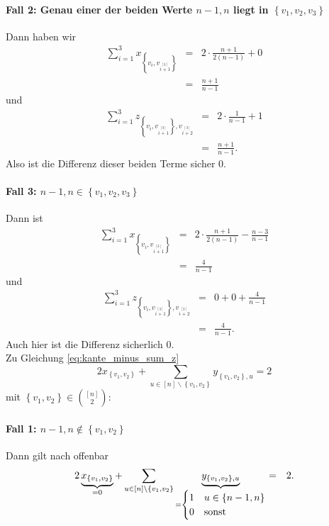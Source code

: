 \documentclass[10p,a4paper,BCOR = 12mm, DIV=15]{scrbook}
\begin{document}
\begin{bew}
\paragraph{Fall 2: Genau einer der beiden Werte $n-1, n$ liegt in $\left\{v_1, v_2, v_3\right\}$} Dann haben wir 
\begin{eqnarray*}
\sum_{i=1}^3 x_{\left\{v_{i}, v_{i \stackrel{\left[3\right]}{+} 1}\right\}} & = & 2 \cdot \frac{n+1}{2\left(n-1\right)} + 0 \\
& = & \frac{n+1}{n-1}
\end{eqnarray*}
und
\begin{eqnarray*}
\sum_{i=1}^3 z_{
\left\{
v_{i}, 
v_{i \stackrel{\left[3\right]}{+} 1}
\right\}, 
v_{i \stackrel{\left[3\right]}{+} 2}} & = & 2\cdot \frac{1}{n-1} + 1 \\
& = & \frac{n+1}{n-1}.
\end{eqnarray*}
Also ist die Differenz dieser beiden Terme sicher 0.

\paragraph{Fall 3: $n-1, n\in \left\{v_1, v_2, v_3\right\}$} Dann ist 
\begin{eqnarray*}
\sum_{i=1}^3 x_{\left\{v_{i}, v_{i \stackrel{\left[3\right]}{+} 1}\right\}} & = & 2 \cdot \frac{n+1}{2\left(n-1\right)} - \frac{n-3}{n-1} \\
& = & \frac{4}{n-1}
\end{eqnarray*}
und
\begin{eqnarray*}
\sum_{i=1}^3 z_{
\left\{
v_{i}, 
v_{i \stackrel{\left[3\right]}{+} 1}
\right\}, 
v_{i \stackrel{\left[3\right]}{+} 2}} & = & 0 + 0 + \frac{4}{n-1} \\
& = & \frac{4}{n-1}.
\end{eqnarray*}
Auch hier ist die Differenz sicherlich 0.
\\

Zu Gleichung \eqref{eq:kante_minus_sum_z} 
\begin{displaymath}
2 x_{\left\{v_1, v_2\right\}} + \sum_{u\in[n]\backslash\left\{v_1, v_2\right\}} y_{\left\{v_1, v_2\right\}, u} = 2
\end{displaymath}
mit $\left\{v_1, v_2\right\} \in {\left[n\right] \choose 2}$:

\paragraph{Fall 1: $n-1, n\notin \left\{v_1, v_2\right\}$} Dann gilt nach offenbar
\begin{eqnarray*}
2 \underbrace{x_{\left\{v_1, v_2\right\}}}_{ = 0} + \sum_{u\in[n]\backslash\left\{v_1, v_2\right\}} \underbrace{y_{\left\{v_1, v_2\right\}, u}}_{ = \begin{cases}
1 & u\in \left\{n-1, n\right\} \\
0 & \textnormal{sonst}
\end{cases}} & = & 2.
\end{eqnarray*}


\end{bew}
\end{document}
